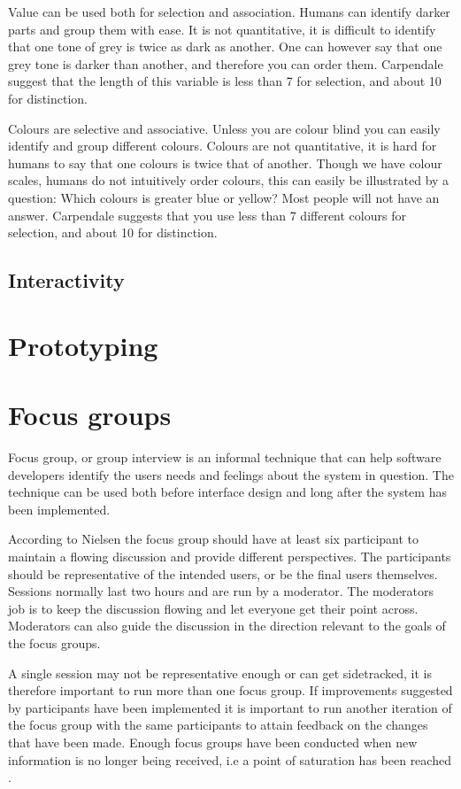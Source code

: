 Value can be used both for selection and association. Humans can identify darker parts and group them with ease. It is not quantitative, it is difficult to identify that one tone of grey is twice as dark as another. One can however say that one grey tone is darker than another, and therefore you can order them. Carpendale suggest that the length of this variable is less than 7 for selection, and about 10 for distinction.

Colours are selective and associative. Unless you are colour blind you can easily identify and group different colours. Colours are not quantitative, it is hard for humans to say that one colours is twice that of another. Though we have colour scales, humans do not intuitively order colours, this can easily be illustrated by a question: Which colours is greater blue or yellow? Most people will not have an answer. Carpendale suggests that you use less than 7 different colours for selection, and about 10 for distinction.

\subsection{Interactivity}

\section{Prototyping}

\section{Focus groups}
Focus group, or group interview is an informal technique that can help software developers identify the users needs and feelings about the system in question. The technique can be used both before interface design and long after the system has been implemented. 

According to Nielsen \cite{focusGroup} the focus group should have at least six participant to maintain a flowing discussion and provide different perspectives. The participants should be representative of the intended users, or be the final users themselves. Sessions normally last two hours and are run by a moderator. The moderators job is to keep the discussion flowing and let everyone get their point across. Moderators can also guide the discussion in the direction relevant to the goals of the focus groups. 

A single session may not be representative enough or can get sidetracked, it is therefore important to run more than one focus group. If improvements suggested by participants have been implemented it is important to run another iteration of the focus group with the same participants to attain feedback on the changes that have been made. Enough focus groups have been conducted when new information is no longer being received, i.e a point of saturation has been reached \cite{howFocusGroup}. 

